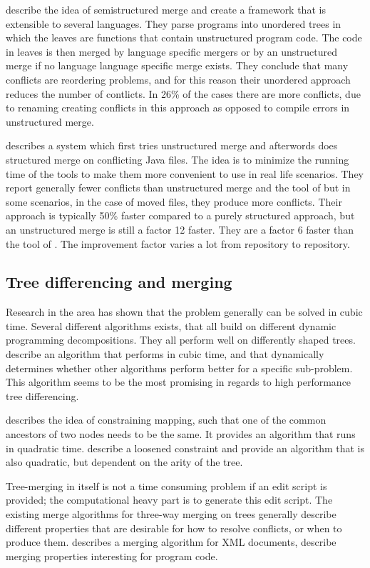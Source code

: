 \documentclass[11pt]{article}
\begin{document}
\citet{Apel} describe the idea of semistructured merge and create a framework that is extensible to several languages. They parse programs into unordered trees in which the leaves are functions that contain unstructured program code. The code in leaves is then merged by language specific mergers or by an unstructured merge if no language language specific merge exists. They conclude that many conflicts are reordering problems, and for this reason their unordered approach reduces the number of contlicts. In 26\% of the cases there are more conflicts, due to renaming creating conflicts in this approach as opposed to compile errors in unstructured merge.

\citet{Olav} describes a system which first tries unstructured merge and afterwords does structured merge on conflicting Java files. The idea is to minimize the running time of the tools to make them more convenient to use in real life scenarios. They report generally fewer conflicts than unstructured merge and the tool of \citet{Apel} but in some scenarios, in the case of moved files, they produce more conflicts. Their approach is typically 50\% faster compared to a purely structured approach, but an unstructured merge is still a factor 12 faster. They are a factor 6 faster than the tool of \citet{Apel}. The improvement factor varies a lot from repository to repository.  

\subsection{Tree differencing and merging}
Research in the area has shown that the problem generally can be solved in cubic time. Several different algorithms exists, that all build on different dynamic programming decompositions. They all perform well on differently shaped trees. \citet{Pawlik} describe an algorithm that performs in cubic time, and that dynamically determines whether other algorithms perform better for a specific sub-problem. This algorithm seems to be the most promising in regards to high performance tree differencing.

\citet{Zhang} describes the idea of constraining mapping, such that one of the common ancestors of two nodes needs to be the same. It provides an algorithm that runs in quadratic time. \citet{Lu} describe a loosened constraint and provide an algorithm that is also quadratic, but dependent on the arity of the tree.

Tree-merging in itself is not a time consuming problem if an edit script is provided; the computational heavy part is to generate this edit script. The existing merge algorithms for three-way merging on trees generally describe different properties that are desirable for how to resolve conflicts, or when to produce them. \citet{lindholm} describes a merging algorithm for XML documents, \citet{Horwitz,Asklund,Olav} describe merging properties interesting for program code.
\end{document}
